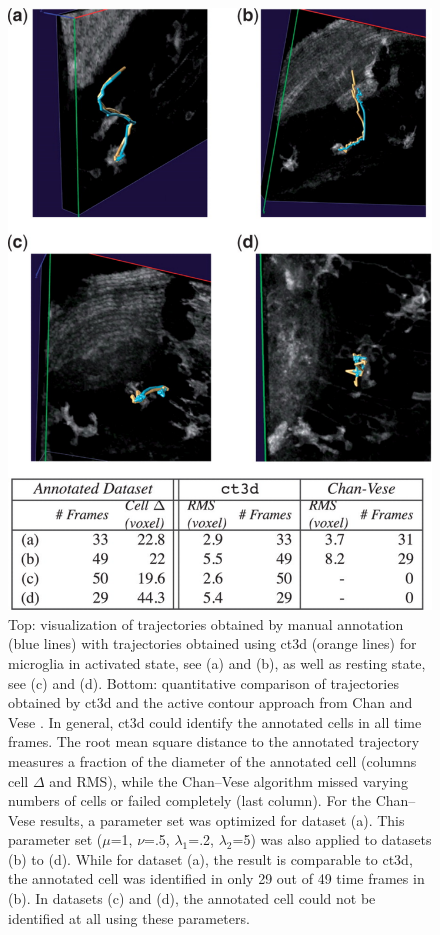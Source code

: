 \begin{figure}[htbp]
\centering
\includegraphics[width=1.0\textwidth]{images/coseg_fig6}
\caption[Cosegmentation results comparison with other methods]{Top: visualization of trajectories obtained by manual annotation (blue lines) with trajectories obtained using ct3d (orange lines) for microglia in activated state, see (a) and (b), as well as resting state, see (c) and (d). Bottom: quantitative comparison of trajectories obtained by ct3d and the active contour approach from Chan and Vese \cite{chan2001active}. In general, ct3d could identify the annotated cells in all time frames. The root mean square distance to the annotated trajectory measures a fraction of the diameter of the annotated cell (columns cell $\Delta$ and RMS), while the Chan–Vese algorithm missed varying numbers of cells or failed completely (last column). For the Chan–Vese results, a parameter set was optimized for dataset (a). This parameter set ($\mu$=1, $\nu$=.5, $\lambda_1$=.2, $\lambda_2$=5) was also applied to datasets (b) to (d). While for dataset (a), the result is comparable to ct3d, the annotated cell was identified in only 29 out of 49 time frames in (b). In datasets (c) and (d), the annotated cell could not be identified at all using these parameters.}
\label{fig:coseg-fig6}
\end{figure}
